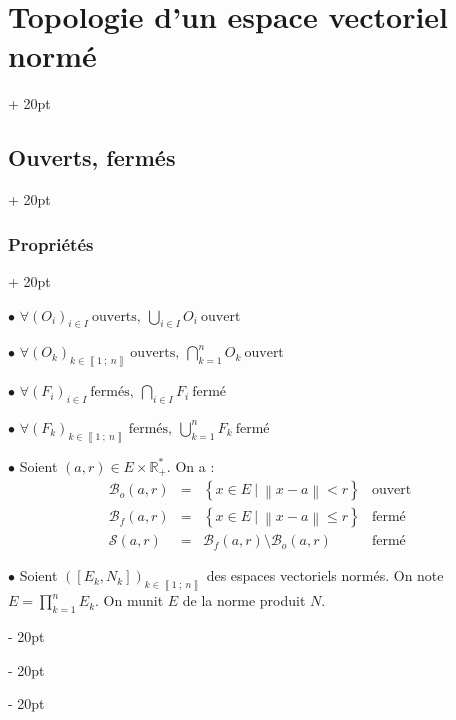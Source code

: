 \documentclass[a4paper, 12pt, twoside]{article}
\newcommand{\R}{\mathbb{R}} %
\newcommand{\nset}[2]{\left\llbracket #1\ ;\ #2 \right\rrbracket}
\newcommand{\lr}[1]{\left( #1 \right)}
\newcommand{\set}[1]{\left\{ #1 \right\}}
\newcommand{\norm}[1]{\left\lVert #1 \right\rVert}
\renewcommand{\le}{\leqslant}
\newcommand{\ind}[1][20pt]{\advance\leftskip + #1}
\newcommand{\deind}[1][20pt]{\advance\leftskip - #1}
\newenvironment{indt}[2][20pt]{#2 \par \ind[#1]}{\par \deind} %
\begin{document}
\begin{indt}{\section{Topologie d'un espace vectoriel normé}}
\begin{indt}{\subsection{Ouverts, fermés}}
\begin{indt}{\subsubsection{Propriétés}}
                \vspace{12pt}
                
                $\bullet$
                $
                    \displaystyle
                    \forall (O_i)_{i \in I}\ \text{ouverts},\
                    \bigcup_{i \in I} O_i\ \text{ouvert}
                $

                $\bullet$
                $
                    \displaystyle
                    \forall (O_k)_{k \in \nset 1 n}\ \text{ouverts},\
                    \bigcap_{k = 1}^n O_k\ \text{ouvert}
                $

                \vspace{6pt}
                
                $\bullet$
                $
                    \displaystyle
                    \forall (F_i)_{i \in I}\ \text{fermés},\
                    \bigcap_{i \in I} F_i\ \text{fermé}
                $

                $\bullet$
                $
                    \displaystyle
                    \forall (F_k)_{k \in \nset 1 n}\ \text{fermés},\
                    \bigcup_{k = 1}^n F_k\ \text{fermé}
                $

                \vspace{12pt}
                
                $\bullet$ Soient $(a, r) \in E \times \R^*_+$. On a :
                \[
                    \begin{array}{rcll}
                        \mathscr B_o(a, r) &=& \set{x \in E\ |\ \norm{x - a} < r}
                        & \text{ouvert}
                        \\
                        \mathscr B_f(a, r) &=& \set{x \in E\ |\ \norm{x - a} \le r}
                        &\text{fermé}
                        \\
                        \mathscr S(a, r) &=& \mathscr B_f(a, r) \setminus \mathscr B_o(a, r)
                        &\text{fermé}
                    \end{array}
                \]

                \vspace{12pt}
                
                $\bullet$ Soient $\displaystyle \lr{[E_k, N_k]}_{k \in \nset 1 n}$ des espaces vectoriels normés.
                On note $E = \displaystyle \prod_{k = 1}^n E_k$.
                On munit $E$ de la norme produit $N$.


\end{indt}
\end{indt}
\end{indt}
\end{document}
